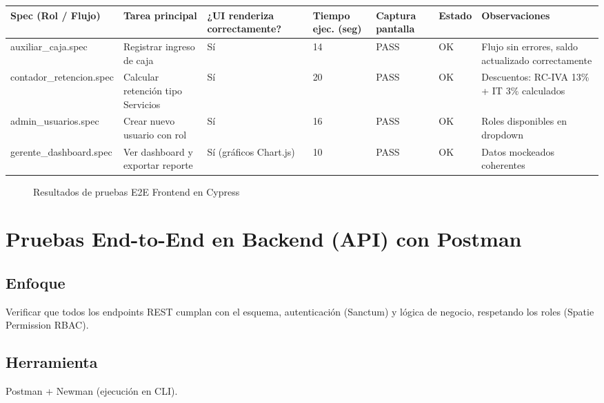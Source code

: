 \documentclass[stu]{apa7}
\begin{document}
\begin{longtable}{|L{3cm}|L{3cm}|C{2.5cm}|C{2cm}|C{2cm}|C{1.5cm}|L{3cm}|}
\hline
{}
\textbf{Spec (Rol / Flujo)} & \textbf{Tarea principal} & \textbf{¿UI renderiza correctamente?} & \textbf{Tiempo ejec. (seg)} & \textbf{Captura pantalla} & \textbf{Estado} & \textbf{Observaciones} \\
\hline
auxiliar\_caja.spec & Registrar ingreso de caja & Sí & 14 & PASS & OK & Flujo sin errores, saldo actualizado correctamente \\
\hline
contador\_retencion.spec & Calcular retención tipo Servicios & Sí & 20 & PASS & OK & Descuentos: RC-IVA 13\% + IT 3\% calculados \\
\hline
admin\_usuarios.spec & Crear nuevo usuario con rol & Sí & 16 & PASS & OK & Roles disponibles en dropdown \\
\hline
gerente\_dashboard.spec & Ver dashboard y exportar reporte & Sí (gráficos Chart.js) & 10 & PASS & OK & Datos mockeados coherentes \\
\hline
\end{longtable}

\begin{figure}[H]
\centering
{}
\caption{Resultados de pruebas E2E Frontend en Cypress}
\end{figure}

\section{Pruebas End-to-End en Backend (API) con Postman}

\subsection{Enfoque}

Verificar que todos los endpoints REST cumplan con el esquema, autenticación (Sanctum) y lógica de negocio, respetando los roles (Spatie Permission RBAC).

\subsection{Herramienta}

Postman + Newman (ejecución en CLI).
\end{document}
